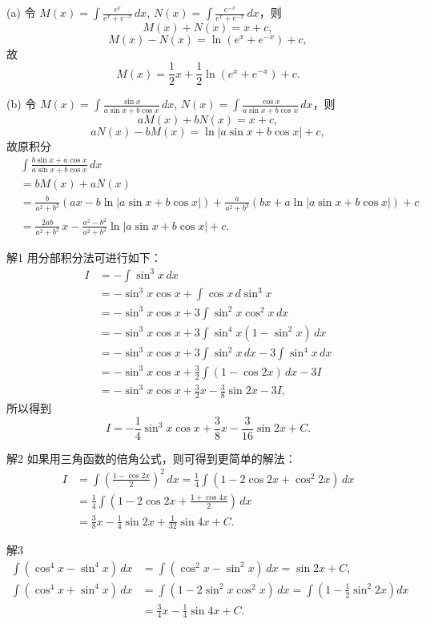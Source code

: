 \documentclass[lang=cn,12pt]{elegantbook}
\begin{document}
\begin{solution}
(a)
令 \( M(x) = \int \frac{e^x}{e^x + e^{-x}} \, dx \), \( N(x) = \int \frac{e^{-x}}{e^x + e^{-x}} \, dx \)，则
\[
M(x) + N(x) = x + c,
\]
\[
M(x) - N(x) = \ln(e^x + e^{-x}) + c,
\]
故
\[
M(x) = \frac{1}{2}x + \frac{1}{2} \ln(e^x + e^{-x}) + c.
\]

(b)
令 \( M(x) = \int \frac{\sin x}{a \sin x + b \cos x} \, dx \), \( N(x) = \int \frac{\cos x}{a \sin x + b \cos x} \, dx \)，则
\[
aM(x) + bN(x) = x + c,
\]
\[
aN(x) - bM(x) = \ln|a \sin x + b \cos x| + c,
\]
故原积分
\[
\begin{aligned}
&\int \frac{b \sin x + a \cos x}{a \sin x + b \cos x} \, dx \\
&= bM(x) + aN(x) \\
&= \frac{b}{a^2+b^2}(ax - b\ln|a\sin x + b\cos x|) + \frac{a}{a^2+b^2}(bx + a\ln|a\sin x + b\cos x|) + c \\
&= \frac{2ab}{a^2+b^2}\,x - \frac{a^2-b^2}{a^2+b^2}\ln|a\sin x + b\cos x| + c.
\end{aligned}
\]
\end{solution}

\begin{solution}
解1
用分部积分法可进行如下：
\[
\begin{aligned}
I &= -\int \sin^3 x \, dx \\
    &= -\sin^3 x \cos x + \int \cos x \, d\sin^3 x \\
    &= -\sin^3 x \cos x + 3 \int \sin^2 x \cos^2 x \, dx \\
    &= -\sin^3 x \cos x + 3 \int \sin^4 x (1 - \sin^2 x) \, dx \\
    &= -\sin^3 x \cos x + 3 \int \sin^2 x \, dx - 3 \int \sin^4 x \, dx \\
    &= -\sin^3 x \cos x + \frac{3}{2} \int (1 - \cos 2x) \, dx - 3I \\
    &= -\sin^3 x \cos x + \frac{3}{2} x - \frac{3}{8} \sin 2x - 3I,
\end{aligned}
\]
所以得到
\[
I = -\frac{1}{4} \sin^3 x \cos x + \frac{3}{8} x - \frac{3}{16} \sin 2x + C.
\]

解2
如果用三角函数的倍角公式，则可得到更简单的解法：
\[
\begin{aligned}
I &= \int \left( \frac{1 - \cos 2x}{2} \right)^2 \, dx = \frac{1}{4} \int (1 - 2\cos 2x + \cos^2 2x) \, dx \\
    &= \frac{1}{4} \int \left( 1 - 2\cos 2x + \frac{1 + \cos 4x}{2} \right) \, dx \\
    &= \frac{3}{8} x - \frac{1}{4} \sin 2x + \frac{1}{32} \sin 4x + C.
\end{aligned}
\]

解3
\[
\begin{aligned}
\int (\cos^4 x - \sin^4 x) \, dx &= \int (\cos^2 x - \sin^2 x) \, dx = \sin 2x + C, \\
\int (\cos^4 x + \sin^4 x) \, dx &= \int (1 - 2\sin^2 x \cos^2 x) \, dx = \int \left(1 - \frac{1}{2}\sin^2 2x\right) dx \\
&= \frac{3}{4}x - \frac{1}{4}\sin 4x + C.
\end{aligned}
\]
\end{solution}
\end{document}
